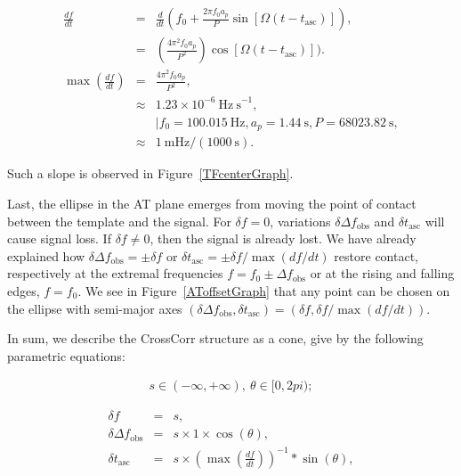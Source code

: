\documentclass{article}
\begin{document}
\begin{eqnarray}
  \frac{df}{dt}
      &=& \frac{d}{dt} \left(f_0 + \frac{2 \pi f_0 a_p}{P} \sin \left[\Omega(t - t_\mathrm{asc})\right]\right),\\
      &=& \left(\frac{4 \pi^2 f_0 a_p}{P^2} \right) \cos[\Omega(t - t_\mathrm{asc})]). \\
  \max \left(\frac{df}{dt} \right)
      &=& \frac{4 \pi^2 f_0 a_p}{P^2},\\
      &\approx& 1.23 \times 10^{-6} \mathrm{~Hz~s}^{-1}, \nonumber\\
      &~& \mid {f_0 = 100.015\mathrm{~Hz}, a_p = 1.44\mathrm{~s}, P = 68023.82\mathrm{~s} },\\
      &\approx& 1\mathrm{~mHz} / (1000\mathrm{~s}).
\end{eqnarray}

\noindent Such a slope is observed in Figure~\ref{TFcenterGraph}.

Last, the ellipse in the AT plane emerges from moving the point of contact between the template and the signal.
For $\delta f = 0$, variations $\delta \Delta f_\mathrm{obs}$ and $\delta t_\mathrm{asc}$ will cause signal loss.
If $\delta f \neq 0$, then the signal is already lost.
We have already explained how $\delta \Delta f_\mathrm{obs} = \pm \delta f$ or $\delta t_\mathrm{asc} = \pm \delta f / \max (df/dt)$ restore contact, respectively at the extremal frequencies $f = f_0 \pm \Delta f_\mathrm{obs}$ or at the rising and falling edges, $f = f_0$.
We see in Figure~\ref{AToffsetGraph} that any point can be chosen on the ellipse with semi-major axes $(\delta \Delta f_\mathrm{obs}, \delta t_\mathrm{asc}) = (\delta f, \delta f/ \max (df /dt))$.

In sum, we describe the CrossCorr structure as a cone, give by the following parametric equations:

\begin{eqnarray}
s \in (-\infty, +\infty),~\theta \in [0, 2 pi);
\end{eqnarray}

\begin{eqnarray}
\delta f                        &=& s, \label{fEq}\\
\delta \Delta f_\mathrm{obs} &=& s \times 1 \times \cos(\theta), \label{aEq}\\
\delta t_\mathrm{asc}                  &=& s \times \left(\max\left(\frac{df}{dt} \right)\right)^{-1} * \sin(\theta) \label{tEq},
\end{eqnarray}
\end{document}
